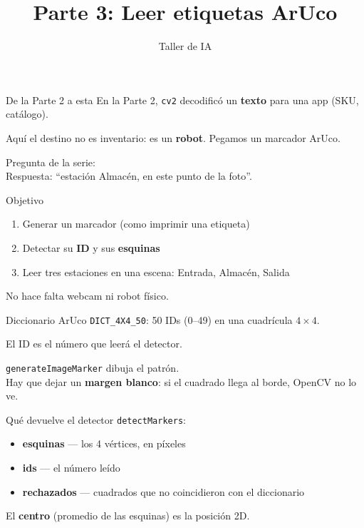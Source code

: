 \documentclass[aspectratio=169]{beamer}
\title{Parte 3: Leer etiquetas ArUco}
\subtitle{\libreta{03\_taller\_aruco.ipynb}}
\author{Taller de IA}
\begin{document}
\begin{frame}
  \titlepage
\end{frame}

\begin{frame}{De la Parte 2 a esta}
  En la Parte 2, \texttt{cv2} decodificó un \textbf{texto} para una app (SKU, catálogo).

  Aquí el destino no es inventario: es un \textbf{robot}. Pegamos un marcador ArUco.

  Pregunta de la serie: \pregunta\\
  Respuesta: ``estación Almacén, en este punto de la foto''.
\end{frame}

\begin{frame}{Objetivo}
  \begin{enumerate}
    \item Generar un marcador (como imprimir una etiqueta)
    \item Detectar su \textbf{ID} y sus \textbf{esquinas}
    \item Leer tres estaciones en una escena: Entrada, Almacén, Salida
  \end{enumerate}

  No hace falta webcam ni robot físico.
\end{frame}

\begin{frame}{Diccionario ArUco}
  \texttt{DICT\_4X4\_50}: 50 IDs (0--49) en una cuadrícula $4\times4$.

  El ID es el número que leerá el detector.

  \texttt{generateImageMarker} dibuja el patrón.\\
  Hay que dejar un \textbf{margen blanco}: si el cuadrado llega al borde, OpenCV no lo ve.
\end{frame}

\begin{frame}{Qué devuelve el detector}
  \texttt{detectMarkers}:

  \begin{itemize}
    \item \textbf{esquinas} --- los 4 vértices, en píxeles
    \item \textbf{ids} --- el número leído
    \item \textbf{rechazados} --- cuadrados que no coincidieron con el diccionario
  \end{itemize}

  El \textbf{centro} (promedio de las esquinas) es la posición 2D.
\end{frame}
\end{document}
